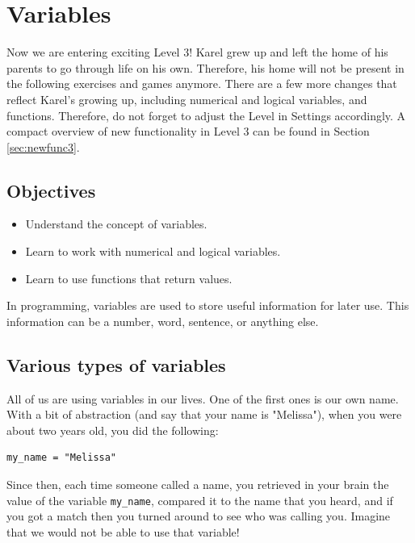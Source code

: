 
\section{Variables} \label{sec:var}

Now we are entering exciting Level 3! Karel grew up and left the home of his 
parents to go through life on his own. Therefore, his home will not be present
in the following exercises and games anymore. There are a few more changes
that reflect Karel's growing up, including numerical and logical variables,
and functions. Therefore, do not forget to adjust the 
Level in Settings accordingly. A compact overview of new functionality in Level 3
can be found in Section \ref{sec:newfunc3}.

\subsection{Objectives} 
 
\begin{itemize}
\item Understand the concept of variables.
\item Learn to work with numerical and logical variables.
\item Learn to use functions that return values. 
\end{itemize}

\noindent
In programming, variables are used to store useful information for later use. This information can 
be a number, word, sentence, or anything else. 

\subsection{Various types of variables}

All of us are using variables in our lives. One of 
the first ones is our own name. With a bit of abstraction (and say that your name is "Melissa"), 
when you were about two years old, you did the following:

\begin{verbatim}
my_name = "Melissa"
\end{verbatim}
Since then, each time someone called a name, you retrieved in your brain the value of the variable
{\tt my\_name}, compared it to the name that you heard, and if you got a match then you turned around 
to see who was calling you. Imagine that we would not be able to use that variable!

